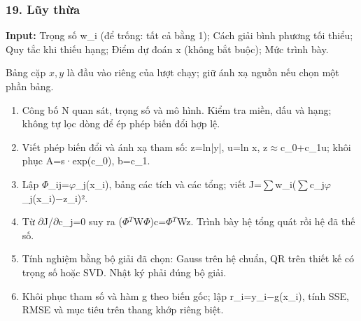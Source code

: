\examplebreak\subsubsection*{19. Lũy thừa}

\textbf{Input:} Trọng số w\_i (\allowbreak{}để trống: tất cả bằng 1);\allowbreak{} Cách giải bình phương tối thiểu;\allowbreak{} Quy tắc khi thiếu hạng;\allowbreak{} Điểm dự đoán x (\allowbreak{}không bắt buộc);\allowbreak{} Mức trình bày.

Bảng cặp $x,y$ là đầu vào riêng của lượt chạy; giữ ánh xạ nguồn nếu chọn một phần bảng.

\begin{enumerate}

\item Công bố N quan sát,\allowbreak{} trọng số và mô hình. Kiểm tra miền,\allowbreak{} dấu và hạng;\allowbreak{} không tự lọc dòng để ép phép biến đổi hợp lệ.

\item Viết phép biến đổi và ánh xạ tham số: z=\allowbreak{}ln|y|,\allowbreak{} u=\allowbreak{}ln x,\allowbreak{} z\ensuremath{\approx}c\_0+\allowbreak{}c\_1u;\allowbreak{} khôi phục A=\allowbreak{}s·exp(\allowbreak{}c\_0),\allowbreak{} b=\allowbreak{}c\_1.

\item Lập \ensuremath{\Phi}\_ij=\allowbreak{}\ensuremath{\varphi}\_j(\allowbreak{}x\_i),\allowbreak{} bảng các tích và các tổng;\allowbreak{} viết J=\allowbreak{}\ensuremath{\sum}w\_i(\allowbreak{}\ensuremath{\sum}c\_j\ensuremath{\varphi}\_j(\allowbreak{}x\_i)\ensuremath{-}z\_i)².

\item Từ \ensuremath{\partial}J/\allowbreak{}\ensuremath{\partial}c\_j=\allowbreak{}0 suy ra (\allowbreak{}\ensuremath{\Phi}\ensuremath{{}^T}W\ensuremath{\Phi})c=\allowbreak{}\ensuremath{\Phi}\ensuremath{{}^T}Wz. Trình bày hệ tổng quát rồi hệ đã thế số.

\item Tính nghiệm bằng bộ giải đã chọn: Gauss trên hệ chuẩn,\allowbreak{} QR trên thiết kế có trọng số hoặc SVD. Nhật ký phải đúng bộ giải.

\item Khôi phục tham số và hàm g theo biến gốc;\allowbreak{} lập r\_i=\allowbreak{}y\_i\ensuremath{-}g(\allowbreak{}x\_i),\allowbreak{} tính SSE,\allowbreak{} RMSE và mục tiêu trên thang khớp riêng biệt.

\end{enumerate}

